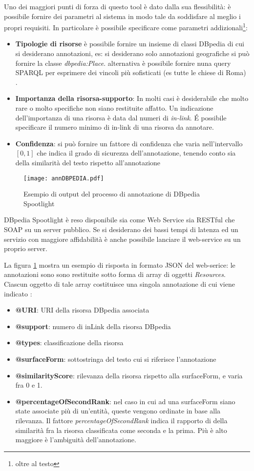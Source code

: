 Uno dei maggiori punti di forza di questo tool è dato dalla sua flessibilità: è possibile fornire dei parametri al sistema in modo tale da soddisfare al meglio i propri requisiti.
In particolare è possibile specificare come parametri addizionali\footnote{oltre al testo}:
\begin{itemize}
\item \textbf{Tipologie di risorse} è possibile fornire un insieme di classi DBpedia di cui si desiderano annotazioni, es:
si desiderano solo annotazioni  geografiche si può fornire la classe \emph{dbpedia:Place}.  alternativa è possibile fornire nuna query SPARQL per esprimere dei vincoli più sofisticati (es  tutte le chiese di Roma) .
\item \textbf{Importanza della risorsa-supporto}: In molti casi è desiderabile che molto rare o molto specifiche non siano restituite affatto. Un indicazione dell'importanza di una risorsa è data dal numeri di \emph{in-link}. \'E possibile specificare il numero minimo di in-link di una risorsa da annotare.
\item \textbf{Confidenza}: si può fornire un fattore di confidenza che varia nell'intervallo $[0,1]$  che indica il grado di sicurezza dell'annotazione, tenendo conto sia della similarità del testo rispetto all'annotazione
\end{itemize}
 

\begin{figure}[h]
    \centering
    \texttt{[image: annDBPEDIA.pdf]}
    \caption{Esempio di output del processo di annotazione di DBpedia Spootlight}
    \label{fig:dbpediaAnn}
\end{figure}   
DBpedia Spootlight è reso disponibile sia come Web Service sia RESTful che SOAP su un server pubblico. Se si desiderano dei bassi tempi di latenza ed un servizio con maggiore affidabilità è anche possibile lanciare il web-service su un proprio server.

La figura \ref{fig:dbpediaAnn} mostra un esempio di risposta in formato JSON del web-serice: le annotazioni sono sono restituite sotto forma di array di oggetti \emph{Resources}.
Ciascun oggetto di tale array costituisce una singola annotazione di cui viene indicato :
\begin{itemize}
\item \textbf{@URI}: URI della risorsa DBpedia associata
\item \textbf{@support}: numero di inLink della risorsa DBpedia
\item \textbf{@types}: classificazione della risorsa 
\item \textbf{@surfaceForm}: sottostringa del testo cui si riferisce l'annotazione
\item \textbf{@similarityScore}: rilevanza della risorsa rispetto alla surfaceForm, e varia fra 0 e 1.
\item \textbf{@percentageOfSecondRank}: nel caso in cui ad una surfaceForm siano state associate più di un'entità, queste vengono ordinate in base alla rilevanza.
Il fattore \emph{percentageOfSecondRank}  indica il rapporto di  della similarità  fra la risorsa classificata come seconda e la prima. Più è alto maggiore è l'ambiguità dell'annotazione.
\end{itemize}


